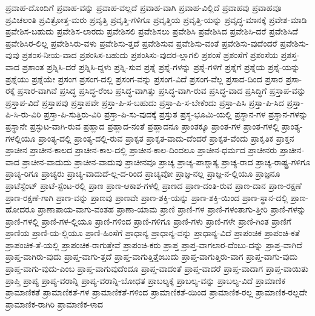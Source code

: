 {ಪ್ರವಾಹ-ದೊಂದಿಗೆ
ಪ್ರವಾಹ-ವನ್ನು
ಪ್ರವಾಹ-ವಲ್ಲದೆ
ಪ್ರವಾಹ-ವಾಗಿ
ಪ್ರವಾಹ-ವಿಲ್ಲಿದೆ
ಪ್ರವಾಹವು
ಪ್ರವಾಹವೂ
ಪ್ರವಿಚಲಂತಿ
ಪ್ರವಿತ್ರೋತ್ತ-ಮರು
ಪ್ರವೃತ್ತಿ
ಪ್ರವೃತ್ತಿ-ಗಳಿಗೂ
ಪ್ರವೃತ್ತಿಯ
ಪ್ರವೃತ್ತಿ-ಯನ್ನು
ಪ್ರವೃದ್ಧ-ಮಾನಕ್ಕೆ
ಪ್ರವೇಶ-ಮಾಡಿ
ಪ್ರವೇಶಿಸ-ಬಹುದು
ಪ್ರವೇಶಿಸ-ಲಾರದು
ಪ್ರವೇಶಿಸಲಿ
ಪ್ರವೇಶಿಸಲು
ಪ್ರವೇಶಿಸಿ
ಪ್ರವೇಶಿಸಿದ
ಪ್ರವೇಶಿಸಿ-ದರೆ
ಪ್ರವೇಶಿಸಿದೆ
ಪ್ರವೇಶಿಸಿರ-ಲಿಲ್ಲ
ಪ್ರವೇಶಿಸಿರು-ವಳು
ಪ್ರವೇಶಿಸು-ತ್ತದೆ
ಪ್ರವೇಶಿಸುವ
ಪ್ರವೇಶಿಸು-ವಂತೆ
ಪ್ರವೇಶಿಸು-ವುದೆಂದರೆ
ಪ್ರವೇಶಿಸು-ವುವು
ಪ್ರಶಂಸ-ನೀಯ-ವಾದ
ಪ್ರಶಂಸಿಸ-ಬಹುದು
ಪ್ರಶಂಸಿಸು-ವುದರ-ಲ್ಲಾಗಲಿ
ಪ್ರಶಂಸೆ
ಪ್ರಶಂಸೆಗೆ
ಪ್ರಶಂಸೆಯ
ಪ್ರಶಸ್ತ-ವಾದ
ಪ್ರಶಾಂತ
ಪ್ರಶ್ನಿಸಿ-ದರೆ
ಪ್ರಶ್ನಿಸಿ-ದ್ದಳು
ಪ್ರಶ್ನಿ-ಸುವ
ಪ್ರಶ್ನೆ
ಪ್ರಶ್ನೆ-ಗಳನ್ನು
ಪ್ರಶ್ನೆ-ಗಳಿಗೆ
ಪ್ರಶ್ನೆಗೆ
ಪ್ರಶ್ನೆಯ
ಪ್ರಶ್ನೆ-ಯನ್ನು
ಪ್ರಶ್ನೆಯು
ಪ್ರಶ್ನೆಯೇ
ಪ್ರಸಂಗ
ಪ್ರಸಂಗ-ದಲ್ಲಿ
ಪ್ರಸಂಗ-ವನ್ನು
ಪ್ರಸಂಗ-ವಿದೆ
ಪ್ರಸಂಗ-ವೆಲ್ಲ
ಪ್ರಸಾದ-ದಿಂದ
ಪ್ರಸಾರ
ಪ್ರಸಾ-ರಕ್ಕೆ
ಪ್ರಸಾರ-ವಾಗಿವೆ
ಪ್ರಸಿದ್ಧ
ಪ್ರಸಿದ್ಧ-ರೆಂಬ
ಪ್ರಸಿದ್ಧ-ವಾಗಿತ್ತು
ಪ್ರಸಿದ್ಧ-ವಾಗಿ-ರುವ
ಪ್ರಸಿದ್ಧ-ವಾದ
ಪ್ರಸಿದ್ಧಿಗೆ
ಪ್ರಸ್ತಾಪ-ವನ್ನು
ಪ್ರಸ್ತಾಪ-ವಿದೆ
ಪ್ರಸ್ತಾಪವು
ಪ್ರಸ್ತಾಪವೇ
ಪ್ರಸ್ತಾ-ಪಿ-ಸ-ಬಹುದು
ಪ್ರಸ್ತಾ-ಪಿ-ಸ-ಬೇಕೆಂದು
ಪ್ರಸ್ತಾ-ಪಿಸಿ
ಪ್ರಸ್ತಾ-ಪಿ-ಸಿದ
ಪ್ರಸ್ತಾ-ಪಿ-ಸಿ-ರು-ವಿರಿ
ಪ್ರಸ್ತಾ-ಪಿ-ಸುತ್ತಿರು-ವಿರಿ
ಪ್ರಸ್ತಾ-ಪಿ-ಸು-ವುದಕ್ಕೆ
ಪ್ರಸ್ತುತ
ಪ್ರಸ್ಥ-ಭೂಮಿ-ಯಲ್ಲಿ
ಪ್ರಸ್ಥಾನ-ಗಳ
ಪ್ರಸ್ಥಾನ-ಗಳನ್ನು
ಪ್ರಸ್ಥಾನೇ
ಪ್ರಸ್ಫುಟ-ವಾಗಿ-ರುವ
ಪ್ರಹ್ಲಾದ
ಪ್ರಹ್ಲಾದ-ನಂತೆ
ಪ್ರಹ್ಲಾದನೂ
ಪ್ರಾಂತಕ್ಕೂ
ಪ್ರಾಂತ-ಗಳ
ಪ್ರಾಂತ-ಗಳಲ್ಲಿ
ಪ್ರಾಂತ್ಯ-ಗಳಲ್ಲಿಯೂ
ಪ್ರಾಂತ್ಯ-ದಲ್ಲಿ
ಪ್ರಾಂತ್ಯ-ದಲ್ಲಿ-ರುವ
ಪ್ರಾಕೃತ
ಪ್ರಾಕೃತ-ವಾದು-ದೆಂದರೆ
ಪ್ರಾಕೃತ-ವೆಂದು
ಪ್ರಾಕೃತಿಕ
ಪ್ರಾಕ್ತನ
ಪ್ರಾಚೀನ
ಪ್ರಾಚೀನ-ಕಾಲದ
ಪ್ರಾಚೀನ-ಕಾಲ-ದಲ್ಲಿ
ಪ್ರಾಚೀನ-ಕಾಲ-ದಿಂದಲೂ
ಪ್ರಾಚೀನ-ಧರ್ಮದ
ಪ್ರಾಚೀನರು
ಪ್ರಾಚೀನ-ವಾದ
ಪ್ರಾಚೀನ-ವಾದುದು
ಪ್ರಾಚೀನ-ವಾದುವು
ಪ್ರಾಚೀನವೂ
ಪ್ರಾಚ್ಯ
ಪ್ರಾಚ್ಯ-ಪಾಶ್ಚಾತ್ಯ
ಪ್ರಾಚ್ಯ-ರಾದ
ಪ್ರಾಚ್ಯ-ರಾಷ್ಟ್ರ-ಗಳಿಗೂ
ಪ್ರಾಚ್ಯ-ರಿಗೂ
ಪ್ರಾಚ್ಯರು
ಪ್ರಾಚ್ಯ-ವಾದುದೆ-ಲ್ಲ-ದ-ರಿಂದ
ಪ್ರಾಚ್ಯವೋ
ಪ್ರಾಜ್ಞ-ನಲ್ಲ
ಪ್ರಾಜ್ಞ-ನ-ಲ್ಲಿಯೂ
ಪ್ರಾಜ್ಞನೂ
ಪ್ರಾಟೆಸ್ಟೆಂಟ್
ಪ್ರಾಟೆ-ಸ್ಟೆಂಟ-ರಲ್ಲಿ
ಪ್ರಾಣ
ಪ್ರಾಣ-ಆಕಾಶ-ಗಳಲ್ಲಿ
ಪ್ರಾಣದ
ಪ್ರಾಣ-ದಂತಿ-ರುವ
ಪ್ರಾಣ-ದಾನ
ಪ್ರಾಣ-ರಕ್ಷಣೆ
ಪ್ರಾಣ-ರಕ್ಷಣೆ-ಗಾಗಿ
ಪ್ರಾಣ-ವನ್ನು
ಪ್ರಾಣವು
ಪ್ರಾಣವೇ
ಪ್ರಾಣ-ಶಕ್ತಿ-ಯನ್ನು
ಪ್ರಾಣ-ಶಕ್ತಿ-ಯಿಂದ
ಪ್ರಾಣ-ಸ್ಥಾನ-ದಲ್ಲಿ
ಪ್ರಾಣ-ಹೋದರೂ
ಪ್ರಾಣಾಪಾಯ-ವಾಗು-ವಂತಹ
ಪ್ರಾಣಾ-ಯಾಮ
ಪ್ರಾಣಿ
ಪ್ರಾಣಿ-ಗಳ
ಪ್ರಾಣಿ-ಗಳಂತಾಗು-ತ್ತೀರಿ
ಪ್ರಾಣಿ-ಗಳನ್ನು
ಪ್ರಾಣಿ-ಗಳಲ್ಲಿ
ಪ್ರಾಣಿ-ಗಳ-ಲ್ಲಿಯೂ
ಪ್ರಾಣಿ-ಗಳಿಂದ
ಪ್ರಾಣಿ-ಗಳಿಗೂ
ಪ್ರಾಣಿ-ಗಳು
ಪ್ರಾಣಿ-ಗಳೇ
ಪ್ರಾಣಿ-ಗಿಂತ
ಪ್ರಾಣಿಗೆ
ಪ್ರಾಣಿಯ
ಪ್ರಾಣಿ-ಯ-ಲ್ಲಿಯೂ
ಪ್ರಾಣಿ-ಹಿಂಸೆಗೆ
ಪ್ರಾಧಾನ್ಯ
ಪ್ರಾಧಾನ್ಯ-ವನ್ನು
ಪ್ರಾಧಾನ್ಯ-ವಿದೆ
ಪ್ರಾಪಂಚಿಕ
ಪ್ರಾಪಂಚಿ-ಕತೆ
ಪ್ರಾಪಂಚಿಕ-ತೆ-ಯಲ್ಲಿ
ಪ್ರಾಪಂಚಿಕ-ರಾಗುತ್ತೇವೆ
ಪ್ರಾಪಂಚಿ-ಕರು
ಪ್ರಾಪ್ತ
ಪ್ರಾಪ್ತ-ವಾಗಲಾರ-ದೆಂಬು-ದನ್ನು
ಪ್ರಾಪ್ತ-ವಾಗಿದೆ
ಪ್ರಾಪ್ತ-ವಾಗಿರು-ವುದು
ಪ್ರಾಪ್ತ-ವಾಗು-ತ್ತದೆ
ಪ್ರಾಪ್ತ-ವಾಗುತ್ತಿತ್ತೆಂಬುದು
ಪ್ರಾಪ್ತ-ವಾಗುತ್ತಿರು-ವಾಗ
ಪ್ರಾಪ್ತ-ವಾಗು-ವುದು
ಪ್ರಾಪ್ತ-ವಾಗು-ವುದು-ಎಂಬ
ಪ್ರಾಪ್ತ-ವಾಗುವುದೆಂದೂ
ಪ್ರಾಪ್ತ-ವಾದಂತೆ
ಪ್ರಾಪ್ತ-ವಾದರೆ
ಪ್ರಾಪ್ತ-ವಾದಾಗ
ಪ್ರಾಪ್ತ-ವಾಯಿತು
ಪ್ರಾಪ್ತಿ
ಪ್ರಾಪ್ಯ
ಪ್ರಾಪ್ಯ-ವರಾನ್ನಿ
ಪ್ರಾಪ್ಯ-ವರಾನ್ನಿ-ಬೋಧತ
ಪ್ರಾಬಲ್ಯಕ್ಕೆ
ಪ್ರಾಬಲ್ಯ-ವನ್ನು
ಪ್ರಾಬಲ್ಯ-ವಿದೆ
ಪ್ರಾಮಾಣಿಕ
ಪ್ರಾಮಾಣಿಕತೆ
ಪ್ರಾಮಾಣಿಕತೆ-ಗಳ
ಪ್ರಾಮಾಣಿಕತೆ-ಗಳಿಂದ
ಪ್ರಾಮಾಣಿಕತೆ-ಯಿಂದ
ಪ್ರಾಮಾಣಿಕ-ರಲ್ಲ
ಪ್ರಾಮಾಣಿಕ-ರಲ್ಲದೇ
ಪ್ರಾಮಾಣಿಕ-ರಾಗಿರಿ
ಪ್ರಾಮಾಣಿಕ-ಳಾದ
}

